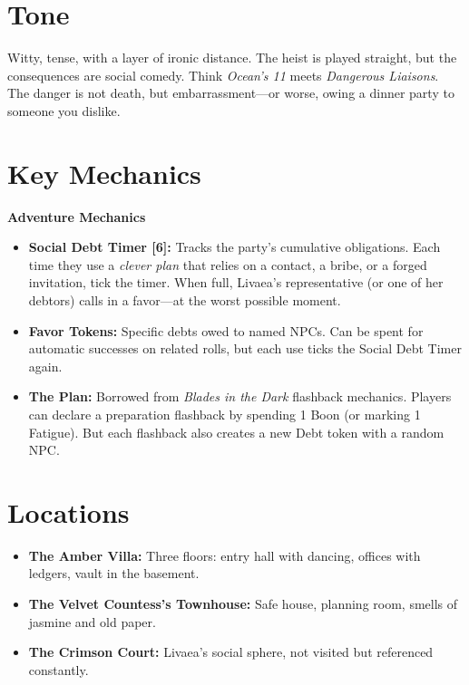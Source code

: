 \documentclass[12pt]{book}
\begin{document}
\section{Tone}

Witty, tense, with a layer of ironic distance. The heist is played straight, but the consequences are social comedy. Think \textit{Ocean's 11} meets \textit{Dangerous Liaisons}. The danger is not death, but embarrassment---or worse, owing a dinner party to someone you dislike.

\section{Key Mechanics}

\begin{infobox}
\textbf{Adventure Mechanics}
\begin{itemize}
    \item \textbf{Social Debt Timer [6]:} Tracks the party's cumulative obligations. Each time they use a \textit{clever plan} that relies on a contact, a bribe, or a forged invitation, tick the timer. When full, Livaea's representative (or one of her debtors) calls in a favor---at the worst possible moment.
    \item \textbf{Favor Tokens:} Specific debts owed to named NPCs. Can be spent for automatic successes on related rolls, but each use ticks the Social Debt Timer again.
    \item \textbf{The Plan:} Borrowed from \textit{Blades in the Dark} flashback mechanics. Players can declare a preparation flashback by spending 1 Boon (or marking 1 Fatigue). But each flashback also creates a new Debt token with a random NPC.
\end{itemize}
\end{infobox}

\section{Locations}

\begin{itemize}
    \item \textbf{The Amber Villa:} Three floors: entry hall with dancing, offices with ledgers, vault in the basement.
    \item \textbf{The Velvet Countess's Townhouse:} Safe house, planning room, smells of jasmine and old paper.
    \item \textbf{The Crimson Court:} Livaea's social sphere, not visited but referenced constantly.
\end{itemize}
\end{document}
